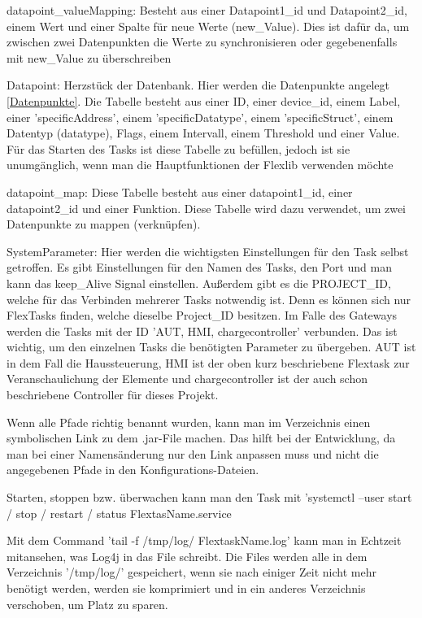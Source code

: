 \begin{compactenum}
\begin{compactenum}
        \item datapoint\_valueMapping: Besteht aus einer Datapoint1\_id und Datapoint2\_id, einem Wert und einer Spalte für neue Werte (new\_Value). Dies ist dafür da, um zwischen zwei Datenpunkten die Werte zu synchronisieren oder gegebenenfalls mit new\_Value zu überschreiben
        \item Datapoint: Herzstück der Datenbank. Hier werden die Datenpunkte angelegt \ref{Datenpunkte}. Die Tabelle besteht aus einer ID, einer device\_id, einem Label, einer 'specificAddress', einem 'specificDatatype', einem 'specificStruct', einem Datentyp (datatype), Flags, einem Intervall, einem Threshold und einer Value. Für das Starten des Tasks ist diese Tabelle zu befüllen, jedoch ist sie unumgänglich, wenn man die Hauptfunktionen der Flexlib verwenden möchte
        \item datapoint\_map: Diese Tabelle besteht aus einer datapoint1\_id, einer datapoint2\_id und einer Funktion. Diese Tabelle wird dazu verwendet, um zwei Datenpunkte zu mappen (verknüpfen).
        \item SystemParameter: Hier werden die wichtigsten Einstellungen für den Task selbst getroffen. Es gibt Einstellungen für den Namen des Tasks, den Port und man kann das keep\_Alive Signal einstellen. Außerdem gibt es die PROJECT\_ID, welche für das Verbinden mehrerer Tasks notwendig ist. Denn es können sich nur FlexTasks finden, welche dieselbe Project\_ID besitzen. Im Falle des Gateways werden die Tasks mit der ID 'AUT, HMI, chargecontroller' verbunden. Das ist wichtig, um den einzelnen Tasks die benötigten Parameter zu übergeben. AUT ist in dem Fall die Haussteuerung, HMI ist der oben kurz beschriebene Flextask zur Veranschaulichung der Elemente und chargecontroller ist der auch schon beschriebene Controller für dieses Projekt.
    \end{compactenum}
    \item Wenn alle Pfade richtig benannt wurden, kann man im Verzeichnis einen symbolischen Link zu dem .jar-File machen. Das hilft bei der Entwicklung, da man bei einer Namensänderung nur den Link anpassen muss und nicht die angegebenen Pfade in den Konfigurations-Dateien.
    \item Starten, stoppen bzw. überwachen kann man den Task mit 'systemctl --user start / stop / restart / status FlextasName.service
    \item Mit dem Command 'tail -f /tmp/log/ FlextaskName.log' kann man in Echtzeit mitansehen, was Log4j in das File schreibt. Die Files werden alle in dem Verzeichnis '/tmp/log/' gespeichert, wenn sie nach einiger Zeit nicht mehr benötigt werden, werden sie komprimiert und in ein anderes Verzeichnis verschoben, um Platz zu sparen.
\end{compactenum}
